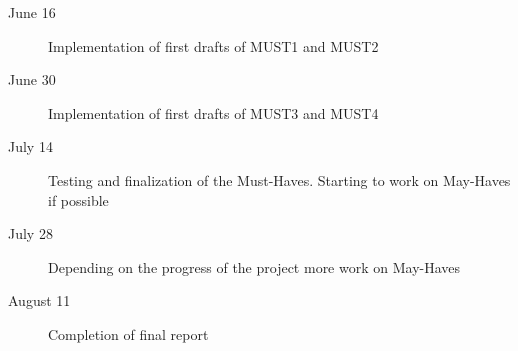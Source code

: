 \begin{description}
	\item[June 16] Implementation of first drafts of MUST1 and MUST2
	\item[June 30] Implementation of first drafts of MUST3 and MUST4
	\item[July 14] Testing and finalization of the Must-Haves. Starting to work on May-Haves if possible
	\item[July 28] Depending on the progress of the project more work on May-Haves
	\item[August 11] Completion of final report
\end{description}
